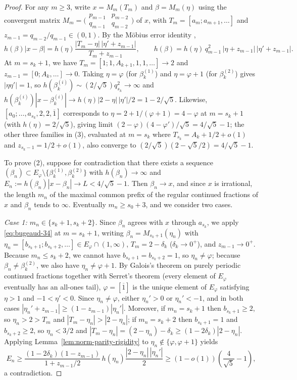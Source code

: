 \documentclass[11pt]{amsart}
\theoremstyle{definition}
\theoremstyle{remark}
\numberwithin{equation}{section}
\begin{document}
\begin{proof}
For any $m\ge3$, write $x=M_m(T_m)$ and $\beta=M_m(\eta)$ using the
convergent matrix $M_m=\bigl(\begin{smallmatrix}p_{m-1}&p_{m-2}\\
q_{m-1}&q_{m-2}\end{smallmatrix}\bigr)$ of $x$, with
$T_m=[a_m;a_{m+1},\ldots]$ and $z_{m-1}=q_{m-2}/q_{m-1}\in(0,1)$.
By the M\"obius error identity \cite[(3.4)]{BugeaudQuad},
\begin{equation}\label{eq:bugeaud-34}
 h(\beta)|x-\beta|
 =h(\eta)\frac{|T_m-\eta|\,|\eta'+z_{m-1}|}{T_m+z_{m-1}},
 \qquad
 h(\beta)=h(\eta)\,q_{m-1}^2\,|\eta+z_{m-1}|\,|\eta'+z_{m-1}|.
\end{equation}
At $m=s_k+1$, we have $T_m=[1;1,A_{k+1},1,1,\ldots]\to2$ and
$z_{m-1}=[0;A_k,\ldots]\to0$. Taking $\eta=\varphi$ (for $\beta_k^{(1)}$)
and $\eta=\varphi+1$ (for $\beta_k^{(2)}$) gives $|\eta\eta'|=1$, so
$h(\beta_k^{(i)})\sim (2/\sqrt5)q_{s_k}^2\to\infty$ and
$h(\beta_k^{(i)})|x-\beta_k^{(i)}|\to h(\eta)|2-\eta|\,|\eta'|/2=1-2/\sqrt5$.
Likewise, $[a_0;\ldots,a_{s_k},2,2,\overline1]$ corresponds to
$\eta=2+1/(\varphi+1)=4-\varphi$ at $m=s_k+1$ (with $h(\eta)=2/\sqrt5$),
giving limit $(2-\varphi)(4-\varphi')/\sqrt5=4/\sqrt5-1$; the other three
families in (3), evaluated at $m=s_k$ where $T_{s_k}=A_k+1/2+o(1)$ and
$z_{s_k-1}=1/2+o(1)$, also converge to $(2/\sqrt5)(2-\sqrt5/2)=4/\sqrt5-1$.

To prove (2), suppose for contradiction that there exists a sequence
$(\beta_n)\subset E_\varphi\setminus\{\beta_k^{(1)},\beta_k^{(2)}\}$
with $h(\beta_n)\to\infty$ and
$E_n:=h(\beta_n)|x-\beta_n|\to L<4/\sqrt5-1$. Then $\beta_n\to x$, and
since $x$ is irrational, the length $m_n$ of the maximal common prefix of
the regular continued fractions of $x$ and $\beta_n$ tends to $\infty$.
Eventually $m_n\ge s_0+3$, and we consider two cases.

\emph{Case 1: $m_n\in\{s_k+1,s_k+2\}$.}
Since $\beta_n$ agrees with $x$ through $a_{s_k}$, we apply
\eqref{eq:bugeaud-34} at $m=s_k+1$, writing $\beta_n=M_{s_k+1}(\eta_n)$
with $\eta_n=[b_{s_k+1};b_{s_k+2},\ldots]\in E_\varphi\cap(1,\infty)$,
$T_m=2-\delta_k$ ($\delta_k\to0^+$), and $z_{m-1}\to0^+$. Because
$m_n\le s_k+2$, we cannot have $b_{s_k+1}=b_{s_k+2}=1$, so
$\eta_n\ne\varphi$; because $\beta_n\ne\beta_k^{(2)}$, we also have
$\eta_n\ne\varphi+1$. By Galois's theorem on purely periodic continued
fractions together with Serret's theorem (every element of $E_\varphi$
eventually has an all-ones tail), $\varphi=[\overline1]$ is the unique
element of $E_\varphi$ satisfying $\eta>1$ and $-1<\eta'<0$. Since
$\eta_n\ne\varphi$, either
$\eta_n'>0$ or $\eta_n'<-1$, and in both cases
$|\eta_n'+z_{m-1}|\ge(1-z_{m-1})|\eta_n'|$. Moreover, if $m_n=s_k+1$ then
$b_{s_k+1}\ge2$, so $\eta_n>2>T_m$ and $|T_m-\eta_n|>|2-\eta_n|$; if
$m_n=s_k+2$ then $b_{s_k+1}=1$ and $b_{s_k+2}\ge2$, so $\eta_n<3/2$ and
$|T_m-\eta_n|=(2-\eta_n)-\delta_k\ge(1-2\delta_k)|2-\eta_n|$. Applying
Lemma~\ref{lem:norm-parity-rigidity} to $\eta_n\notin\{\varphi,\varphi+1\}$
yields
\[
 E_n
 \ge \frac{(1-2\delta_k)(1-z_{m-1})}{1+z_{m-1}/2}\,
     h(\eta_n)\frac{|2-\eta_n|\,|\eta_n'|}{2}
 \ge (1-o(1))\left(\frac{4}{\sqrt5}-1\right),
\]
a contradiction.


\end{proof}
\end{document}
